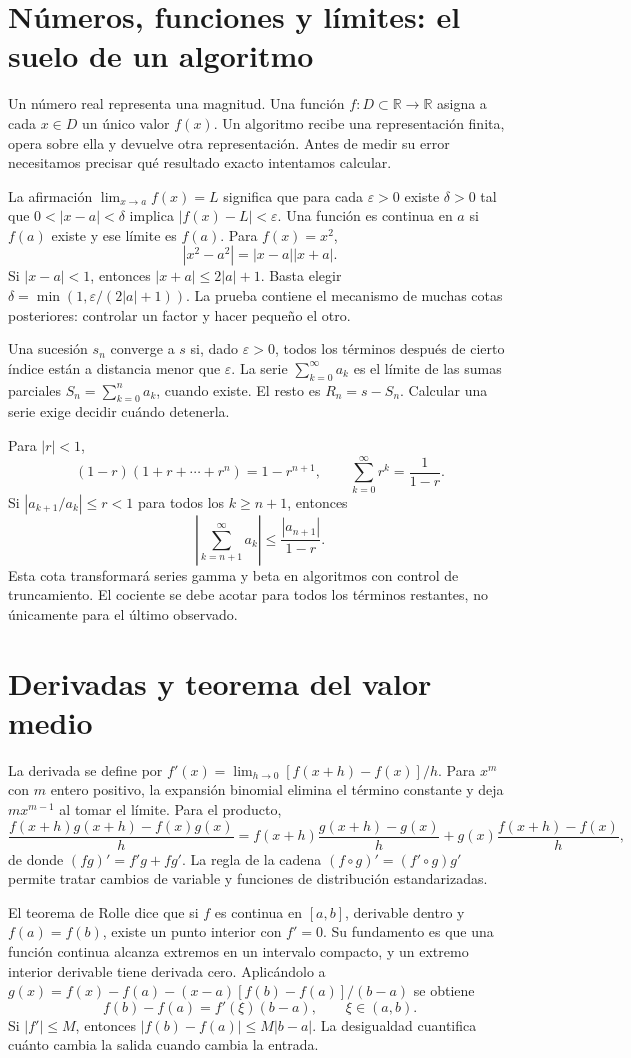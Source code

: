 \documentclass[11pt,a4paper]{article}
\newcommand{\R}{\mathbb R}
\theoremstyle{definition}
\newcommand{\eps}{\varepsilon}
\begin{document}
\section{Números, funciones y límites: el suelo de un algoritmo}
Un número real representa una magnitud. Una función $f:D\subset\R\to\R$ asigna a cada $x\in D$ un único valor $f(x)$. Un algoritmo recibe una representación finita, opera sobre ella y devuelve otra representación. Antes de medir su error necesitamos precisar qué resultado exacto intentamos calcular.

La afirmación $\lim_{x\to a}f(x)=L$ significa que para cada $\eps>0$ existe $\delta>0$ tal que $0<|x-a|<\delta$ implica $|f(x)-L|<\eps$. Una función es continua en $a$ si $f(a)$ existe y ese límite es $f(a)$. Para $f(x)=x^2$,
\[
|x^2-a^2|=|x-a||x+a|.
\]
Si $|x-a|<1$, entonces $|x+a|\le2|a|+1$. Basta elegir $\delta=\min(1,\eps/(2|a|+1))$. La prueba contiene el mecanismo de muchas cotas posteriores: controlar un factor y hacer pequeño el otro.

Una sucesión $s_n$ converge a $s$ si, dado $\eps>0$, todos los términos después de cierto índice están a distancia menor que $\eps$. La serie $\sum_{k=0}^\infty a_k$ es el límite de las sumas parciales $S_n=\sum_{k=0}^n a_k$, cuando existe. El resto es $R_n=s-S_n$. Calcular una serie exige decidir cuándo detenerla.

Para $|r|<1$,
\[
(1-r)(1+r+\cdots+r^n)=1-r^{n+1},\qquad
\sum_{k=0}^\infty r^k=\frac1{1-r}.
\]
Si $|a_{k+1}/a_k|\le r<1$ para todos los $k\ge n+1$, entonces
\[
\left|\sum_{k=n+1}^\infty a_k\right|\le\frac{|a_{n+1}|}{1-r}.
\]
Esta cota transformará series gamma y beta en algoritmos con control de truncamiento. El cociente se debe acotar para todos los términos restantes, no únicamente para el último observado.

\section{Derivadas y teorema del valor medio}
La derivada se define por $f'(x)=\lim_{h\to0}[f(x+h)-f(x)]/h$. Para $x^m$ con $m$ entero positivo, la expansión binomial elimina el término constante y deja $mx^{m-1}$ al tomar el límite. Para el producto,
\[
\frac{f(x+h)g(x+h)-f(x)g(x)}h
=f(x+h)\frac{g(x+h)-g(x)}h
 +g(x)\frac{f(x+h)-f(x)}h,
\]
de donde $(fg)'=f'g+fg'$. La regla de la cadena $(f\circ g)'=(f'\circ g)g'$ permite tratar cambios de variable y funciones de distribución estandarizadas.

El teorema de Rolle dice que si $f$ es continua en $[a,b]$, derivable dentro y $f(a)=f(b)$, existe un punto interior con $f'=0$. Su fundamento es que una función continua alcanza extremos en un intervalo compacto, y un extremo interior derivable tiene derivada cero. Aplicándolo a
$g(x)=f(x)-f(a)-(x-a)[f(b)-f(a)]/(b-a)$ se obtiene
\[
f(b)-f(a)=f'(\xi)(b-a),\qquad \xi\in(a,b).
\]
Si $|f'|\le M$, entonces $|f(b)-f(a)|\le M|b-a|$. La desigualdad cuantifica cuánto cambia la salida cuando cambia la entrada.
\end{document}
